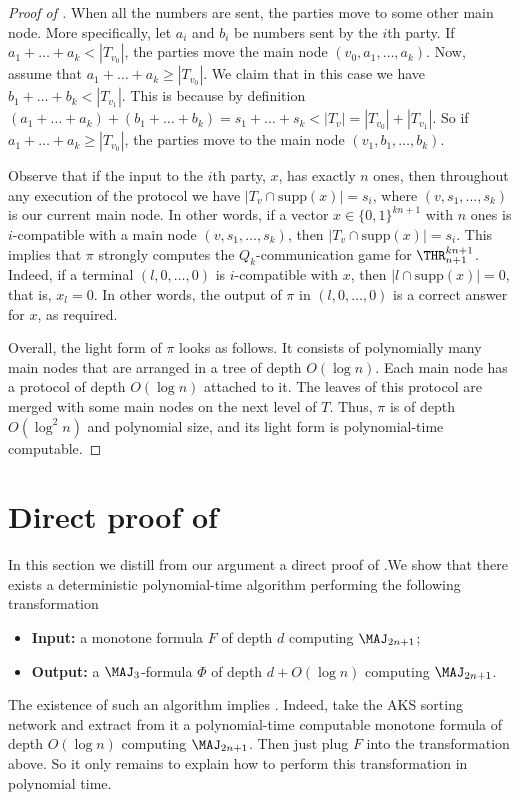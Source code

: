 \begin{proof}[Proof of ]
When all the numbers are sent, the parties move to some other main node. More specifically, let $a_i$ and $b_i$ be numbers sent by the $i$th party. If $a_1 + \ldots + a_k < |T_{v_0}|$, the parties move the main node $(v_0, a_1, \ldots, a_k)$. Now, assume that $a_1 + \ldots + a_k \ge |T_{v_0}|$. We claim that in this case we have $b_1 + \ldots + b_k < |T_{v_1}|$. This is because by definition $(a_1 + \ldots + a_k) + (b_1 + \ldots + b_k) = s_1 + \ldots + s_k < |T_v| = |T_{v_0}| + |T_{v_1}|$. So if $a_1 + \ldots + a_k \ge |T_{v_0}|$, the parties move to the main node $(v_1, b_1, \ldots, b_k)$.

Observe that if the input to the $i$th party, $x$, has exactly $n$ ones, then throughout any execution of the protocol we have $|T_v\cap\mathrm{supp}(x)| = s_i$, where $(v, s_1, \ldots, s_k)$ is our current main node. In other words, if a vector $x\in\{0, 1\}^{kn + 1}$ with $n$ ones is $i$-compatible with a main node $(v, s_1, \ldots, s_k)$, then $|T_{v}\cap\mathrm{supp}(x)| = s_i$.  This implies that $\pi$ strongly computes the $Q_k$-communication game for $\THR^{kn+1}_{n+1}$. Indeed, if a terminal $(l, 0, \ldots, 0)$ is $i$-compatible with $x$, then $|{l}\cap \mathrm{supp}(x)| = 0$, that is, $x_l = 0$.  In other words, the output of $\pi$ in $(l, 0, \ldots, 0)$ is a correct answer for $x$, as required.




Overall, the light form of $\pi$ looks as follows. 
It consists of polynomially many main nodes that are arranged in 
%
a tree of depth $O(\log n)$.  %
Each main node has %
a protocol of depth $O(\log n)$  %
attached to it. %
The leaves  %
of this protocol are merged with some main nodes on the next level of $T$. Thus, $\pi$ is of depth $O(\log^2 n)$ and polynomial size, and its light form is polynomial-time computable.
\end{proof}







\section{Direct proof of }
\label{sec:direct}
In this section we distill from our argument a direct proof of .We show that there exists a deterministic polynomial-time algorithm performing the following transformation
\begin{itemize}
\item \textbf{Input:} a monotone formula $F$ of depth $d$  computing $\MAJ_{2n + 1}$;
\item \textbf{Output:} a $\MAJ_3$-formula $\Phi$ of depth $d + O(\log n)$ computing $\MAJ_{2n + 1}$.
\end{itemize}
The existence of such an algorithm implies . Indeed, take the AKS sorting network and extract from it a polynomial-time computable %
monotone formula of depth $O(\log n)$  %
computing $\MAJ_{2n + 1}$. Then just 
%
plug $F$  %
into the transformation above. So it only remains to explain how to perform this transformation in polynomial time.

